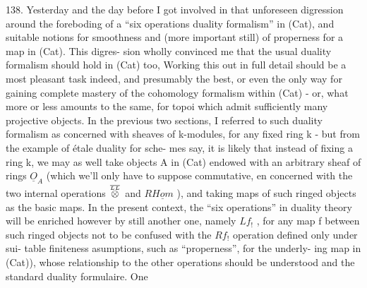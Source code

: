 138. Yesterday and the day before\hand{,} I got involved  in that
unforeseen digression\deleted{\unsure{,}} around the foreboding of a ``six operations
duality formalism'' in (Cat), and suitable notions for smoothness and
(more important still) of properness for a map in (Cat). This digres-%
sion wholly convinced me that the usual duality formalism should hold
in (Cat) too, Working this out in full detail should be a most pleasant
task indeed, and presumably the best, or even the only way for gaining
complete mastery of the cohomology formalism within (Cat) - or, what
more or less amounts to the same, for topoi which admit sufficiently
many projective objects. In the previous two sections, I referred to
such duality formalism as  concerned with sheaves of k-modules, for any
fixed ring k - but from the example of étale duality  for sche-%
mes say, it is likely that instead of fixing a ring k, we may as
well take objects A in (Cat) endowed with an arbitrary sheaf of rings
$\underline{O}_{A}$ (which we'll only have to suppose commutative, en concerned with
the two\hand{,} internal operations $\overset{\over{L}{L}}{\otimes}$ and $R\underline{Hom}$ ), and taking maps of such
ringed objects as the basic maps. In the present context, the  ``six
operations'' in duality theory will be enriched however by still another
\margin{! $\times$} one, namely $Lf_{!}$ ,   for any map f between such ringed objects\deleted{\unsure{,}}
\hand{(}not to be confused with the $Rf_{!}$ operation\hand{,} \deleted{(}defined only under sui-%
table finiteness asumptions, such as ``properness'', for the underly-%
ing map in (Cat)), whose relationship to the other operations should
be understood and    the standard duality formulaire. One


